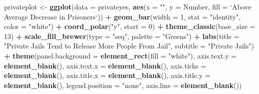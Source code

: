 \documentclass[
]{article}
\newenvironment{Shaded}{\begin{snugshade}}{\end{snugshade}}
\newcommand{\DataTypeTok}[1]{\textcolor[rgb]{0.13,0.29,0.53}{#1}}
\newcommand{\DecValTok}[1]{\textcolor[rgb]{0.00,0.00,0.81}{#1}}
\newcommand{\KeywordTok}[1]{\textcolor[rgb]{0.13,0.29,0.53}{\textbf{#1}}}
\newcommand{\NormalTok}[1]{#1}
\newcommand{\OperatorTok}[1]{\textcolor[rgb]{0.81,0.36,0.00}{\textbf{#1}}}
\newcommand{\StringTok}[1]{\textcolor[rgb]{0.31,0.60,0.02}{#1}}
\begin{document}
\begin{Shaded}
\begin{Highlighting}[]
{{{{{{\NormalTok{privateplot <-}\StringTok{ }\KeywordTok{ggplot}\NormalTok{(}\DataTypeTok{data =}\NormalTok{ privateyes, }\KeywordTok{aes}\NormalTok{(}\DataTypeTok{x =} \StringTok{""}\NormalTok{, }\DataTypeTok{y =}\NormalTok{ Number, }\DataTypeTok{fill =} \StringTok{`}\DataTypeTok{Above Average Decrease in Prisoners}\StringTok{`}\NormalTok{)) }\OperatorTok{+}
\StringTok{  }\KeywordTok{geom_bar}\NormalTok{(}\DataTypeTok{width =} \DecValTok{1}\NormalTok{, }\DataTypeTok{stat =} \StringTok{"identity"}\NormalTok{, }\DataTypeTok{color =} \StringTok{"white"}\NormalTok{) }\OperatorTok{+}
\StringTok{  }\KeywordTok{coord_polar}\NormalTok{(}\StringTok{"y"}\NormalTok{, }\DataTypeTok{start =} \DecValTok{0}\NormalTok{) }\OperatorTok{+}
\StringTok{  }\KeywordTok{theme_classic}\NormalTok{(}\DataTypeTok{base_size =} \DecValTok{13}\NormalTok{) }\OperatorTok{+}
\StringTok{  }\KeywordTok{scale_fill_brewer}\NormalTok{(}\DataTypeTok{type =} \StringTok{"seq"}\NormalTok{, }\DataTypeTok{palette =} \StringTok{"Greens"}\NormalTok{) }\OperatorTok{+}
\StringTok{  }\KeywordTok{labs}\NormalTok{(}\DataTypeTok{title =} \StringTok{"Private Jails Tend to Release More People}
\StringTok{From Jail"}\NormalTok{,}
  \DataTypeTok{subtitle =} \StringTok{"Private Jails"}\NormalTok{) }\OperatorTok{+}
\StringTok{   }\KeywordTok{theme}\NormalTok{(}\DataTypeTok{panel.background =} \KeywordTok{element_rect}\NormalTok{(}\DataTypeTok{fill =} \StringTok{"white"}\NormalTok{),}
        \DataTypeTok{axis.text.y =} \KeywordTok{element_blank}\NormalTok{(),}
        \DataTypeTok{axis.text.x =} \KeywordTok{element_blank}\NormalTok{(),}
        \DataTypeTok{axis.ticks =} \KeywordTok{element_blank}\NormalTok{(),}
        \DataTypeTok{axis.title.x =} \KeywordTok{element_blank}\NormalTok{(),}
        \DataTypeTok{axis.title.y =} \KeywordTok{element_blank}\NormalTok{(),}
        \DataTypeTok{legend.position =} \StringTok{"none"}\NormalTok{,}
        \DataTypeTok{axis.line =} \KeywordTok{element_blank}\NormalTok{())}

}}}}}}
\end{Highlighting}
\end{Shaded}
\end{document}
